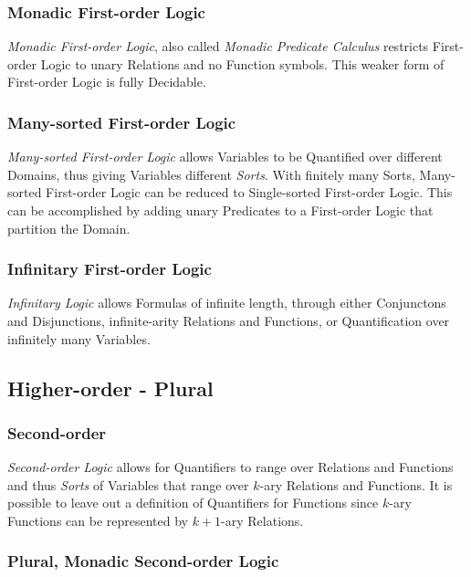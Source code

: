 \documentclass{article}
\begin{document}
\subsubsection{Monadic First-order Logic}

\emph{Monadic First-order Logic}, also called \emph{Monadic Predicate
  Calculus} restricts First-order Logic to unary Relations and no
Function symbols. This weaker form of First-order Logic is fully
Decidable.

\subsubsection{Many-sorted First-order Logic}

\emph{Many-sorted First-order Logic} allows Variables to be Quantified
over different Domains, thus giving Variables different
\emph{Sorts}. With finitely many Sorts, Many-sorted First-order Logic
can be reduced to Single-sorted First-order Logic. This can be
accomplished by adding unary Predicates to a First-order Logic that
partition the Domain.

\subsubsection{Infinitary First-order Logic}

\emph{Infinitary Logic} allows Formulas of infinite length, through
either Conjunctons and Disjunctions, infinite-arity Relations and
Functions, or Quantification over infinitely many Variables.

\subsection{Higher-order - Plural}\label{subsec:higher_order}

\subsubsection{Second-order}

\emph{Second-order Logic} allows for Quantifiers to range over
Relations and Functions and thus \emph{Sorts} of Variables that range
over $k$-ary Relations and Functions. It is possible to leave out a
definition of Quantifiers for Functions since $k$-ary Functions can be
represented by $k+1$-ary Relations.\cite{shapiro00}

\subsubsection{Plural, Monadic Second-order Logic}
\end{document}
